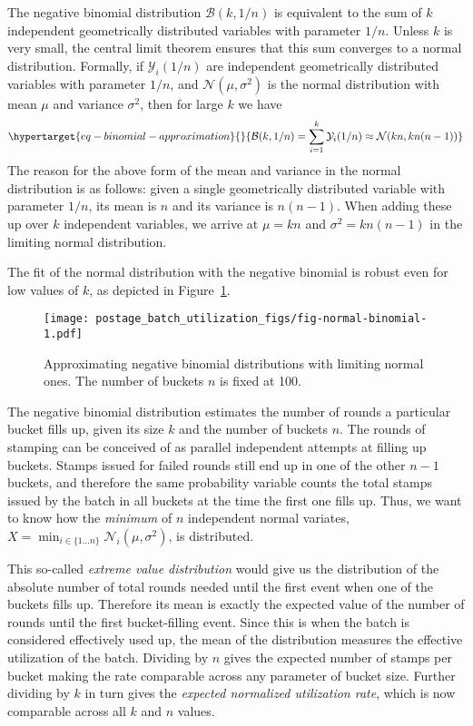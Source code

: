 The negative binomial distribution $\mathcal{B}(k, 1/n)$ is equivalent
to the sum of $k$ independent geometrically distributed variables with
parameter $1/n$. Unless $k$ is very small, the central limit theorem
ensures that this sum converges to a normal distribution. Formally, if
$\mathcal{Y}_i(1/n)$ are independent geometrically distributed
variables with parameter $1/n$, and $\mathcal{N}(\mu, \sigma^2)$ is
the normal distribution with mean $\mu$ and variance $\sigma^2$,
then for large $k$ we have
\begin{equation}\protect\hypertarget{eq-binomial-approximation}{}{
\mathcal{B}(k, 1/n) = \sum_{i=1}^k \mathcal{Y}_i(1/n) \approx \mathcal{N}(kn, kn(n-1))
}\label{eq-binomial-approximation}\end{equation} The reason for the
above form of the mean and variance in the normal distribution is as
follows: given a single geometrically distributed variable with
parameter $1/n$, its mean is $n$ and its variance is $n(n-1)$.
When adding these up over $k$ independent variables, we arrive at
$\mu = k n$ and $\sigma^2 = k n (n - 1)$ in the limiting normal
distribution.

The fit of the normal distribution with the negative binomial is robust even for
low values of $k$, as depicted in Figure~\ref{fig-normal-binomial}.

\begin{figure}
  \centering
  \texttt{[image: postage\_batch\_utilization\_figs/fig-normal-binomial-1.pdf]}
  \caption[Approximating negative binomial]{\label{fig-normal-binomial}Approximating negative binomial distributions with limiting normal ones. The number of buckets $n$ is fixed at 100.}
\end{figure}

The negative binomial distribution estimates the number of rounds a
particular bucket fills up, given its size $k$ and the number of
buckets $n$. The rounds of stamping can be conceived of as parallel
independent attempts at filling up buckets. Stamps issued for failed
rounds still end up in one of the other $n - 1$ buckets, and therefore
the same probability variable counts the total stamps issued by the
batch in all buckets at the time the first one fills up. Thus, we want
to know how the \emph{minimum} of $n$ independent normal variates,
$X = \min_{i \in \{1\ldots n\}} \mathcal{N}_i(\mu, \sigma^2)$, is
distributed.

This so-called \emph{extreme value distribution} would give us the
distribution of the absolute number of total rounds needed until the
first event when one of the buckets fills up. Therefore its mean is
exactly the expected value of the number of rounds until the first
bucket-filling event. Since this is when the batch is considered
effectively used up, the mean of the distribution measures the effective
utilization of the batch. Dividing by $n$ gives the expected number of
stamps per bucket making the rate comparable across any parameter of
bucket size. Further dividing by $k$ in turn gives the \emph{expected
normalized utilization rate}, which is now comparable across all $k$
and $n$ values.

